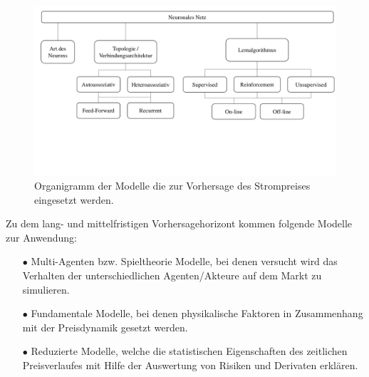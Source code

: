 \begin{figure}[!htb]
    \centering
        \includegraphics[page=2,width=1\textwidth]{Bilder/misc/ANN_Organigramme.pdf}
    \caption[Modelle die zur Vorhersage des Strompreises]{Organigramm der Modelle die zur Vorhersage des Strompreises eingesetzt werden.\protect\footnotemark{}}
    \label{fig:ann_vorhers._modelle}
\end{figure}
\addtocounter{footnote}{-1}     %
\addtocounter{Hfootnote}{-1}    %
\wrapfigfoot{}



Zu dem lang- und mittelfristigen Vorhersagehorizont kommen folgende Modelle zur Anwendung:
\begin{itemize}
\item[\textbf{$\bullet$}]%
Multi-Agenten bzw. Spieltheorie Modelle, bei denen versucht wird das Verhalten der unterschiedlichen Agenten/Akteure auf dem Markt zu simulieren.

\item[\textbf{$\bullet$}]%
Fundamentale Modelle, bei denen physikalische Faktoren in Zusammenhang mit der Preisdynamik gesetzt werden.

\item[\textbf{$\bullet$}]%
Reduzierte Modelle, welche die statistischen Eigenschaften des zeitlichen Preisverlaufes mit Hilfe der Auswertung von Risiken und Derivaten erklären.
\end{itemize}

